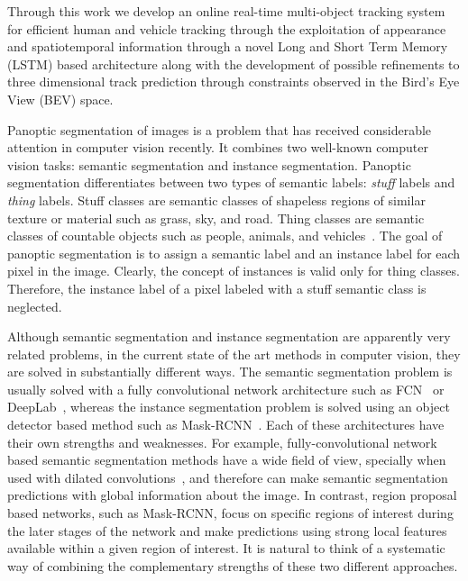 Through this work we develop an online real-time multi-object tracking system for efficient human and vehicle tracking through the exploitation of appearance and spatiotemporal information through a novel Long and Short Term Memory (LSTM) \cite{DeepSiam:LSTM} based architecture along with the development of possible refinements to three dimensional track prediction through constraints observed in the Bird’s Eye View (BEV) space.


Panoptic segmentation of images is a problem that has received considerable attention in computer vision recently. It combines two well-known computer vision tasks: semantic segmentation and instance segmentation. Panoptic segmentation differentiates between two types of semantic labels: \emph{stuff} labels and \emph{thing} labels. Stuff classes are semantic classes of shapeless regions of similar texture or material such as grass, sky, and road. Thing classes are semantic classes of countable objects such as people, animals, and vehicles~\cite{panoptickirillov2017}. The goal of panoptic segmentation is to assign a semantic label and an instance label for each pixel in the image. Clearly, the concept of instances is valid only for thing classes. Therefore, the instance label of a pixel labeled with a stuff semantic class is neglected.

Although semantic segmentation and instance segmentation are apparently very related problems, in the current state of the art methods in computer vision, they are solved in substantially different ways. The semantic segmentation problem is usually solved with a fully convolutional network architecture such as FCN~\cite{fcn_pami2017} or DeepLab~\cite{Deeplab_pami}, whereas the instance segmentation problem is solved using an object detector based method such as Mask-RCNN~\cite{mask_rcnn}. Each of these architectures have their own strengths and weaknesses. For example, fully-convolutional network based semantic segmentation methods have a wide field of view, specially when used with dilated convolutions~\cite{dialated_conv}, and therefore can make semantic segmentation predictions with global information about the image. In contrast, region proposal based networks, such as Mask-RCNN, focus on specific regions of interest during the later stages of the network and make predictions using strong local features available within a given region of interest. It is natural to think of a systematic way of combining the complementary strengths of these two different approaches.

